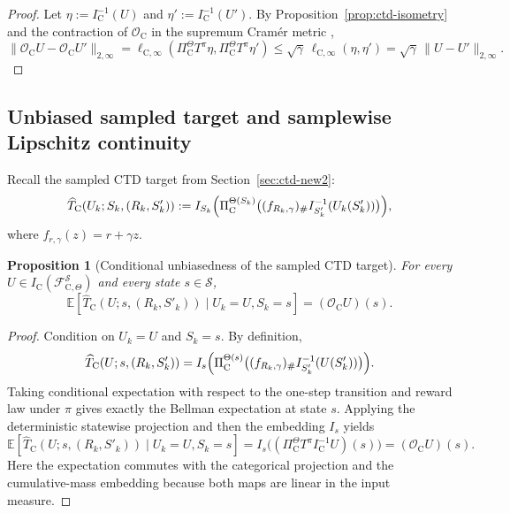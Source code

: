 \documentclass{article}
\newtheorem{proposition}[theorem]{Proposition}
\newcommand{\X}{\mathcal{S}}
\begin{document}
\begin{proof}
Let $\eta:=I_{\mathrm C}^{-1}(U)$ and $\eta':=I_{\mathrm C}^{-1}(U')$. By Proposition~\ref{prop:ctd-isometry} and the contraction of $\mathcal O_{\mathrm C}$ in the supremum Cram\'er metric \citep{bellemare2023distributional},
\begin{equation}
\lVert \mathcal O_{\mathrm C}U-\mathcal O_{\mathrm C}U'\rVert_{2,\infty} = \ell_{\mathrm C,\infty}(\Pi_{\mathrm C}^{\Theta}T^\pi\eta,\Pi_{\mathrm C}^{\Theta}T^\pi\eta') \le \sqrt{\gamma}\,\ell_{\mathrm C,\infty}(\eta,\eta') = \sqrt{\gamma}\,\lVert U-U'\rVert_{2,\infty}.
\end{equation}
\end{proof}

\subsection{Unbiased sampled target and samplewise Lipschitz continuity}

Recall the sampled CTD target from Section~\ref{sec:ctd-new2}:
\begin{equation}
\widehat T_{\mathrm C}(U_k;S_k,(R_k,S'_k)) := I_{S_k} \Bigl(\Pi_{\mathrm C}^{\Theta(S_k)}\bigl((f_{R_k,\gamma})_\# I_{S'_k}^{-1}(U_k(S'_k))\bigr)\Bigr),
\end{equation}
where $f_{r,\gamma}(z)=r+\gamma z$.

\begin{proposition}[Conditional unbiasedness of the sampled CTD target]
\label{prop:ctd-unbiased}
For every $U\in I_{\mathrm C}(\mathcal F^{\X}_{\mathrm C,\Theta})$ and every state $s\in \X$,
\begin{equation}
\mathbb E\left[\widehat T_{\mathrm C}(U;s,(R_k,S'_k))\mid U_k=U, S_k=s\right] = (\mathcal O_{\mathrm C}U)(s).
\end{equation}
\end{proposition}

\begin{proof}
Condition on $U_k=U$ and $S_k=s$. By definition,
\begin{equation}
\widehat T_{\mathrm C}(U;s,(R_k,S'_k)) = I_s\Bigl(\Pi_{\mathrm C}^{\Theta(s)}\bigl((f_{R_k,\gamma})_\# I_{S'_k}^{-1}(U(S'_k))\bigr)\Bigr).
\end{equation}
Taking conditional expectation with respect to the one-step transition and reward law under $\pi$ gives exactly the Bellman expectation at state $s$. Applying the deterministic statewise projection and then the embedding $I_s$ yields
\begin{equation}
\mathbb E\left[\widehat T_{\mathrm C}(U;s,(R_k,S'_k))
\mid U_k=U, S_k=s\right] = I_s\bigl((\Pi_{\mathrm C}^{\Theta}T^\pi I_{\mathrm C}^{-1}U)(s)\bigr) = (\mathcal O_{\mathrm C}U)(s).
\end{equation}
Here the expectation commutes with the categorical projection and the cumulative-mass embedding because both maps are linear in the input measure.
\end{proof}
\end{document}
